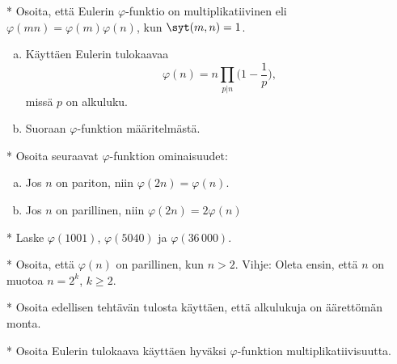 \begin{kotitehtavasivu}
\begin{tehtava}
    * Osoita, että Eulerin $\varphi$-funktio on multiplikatiivinen
    eli $\varphi(mn) = \varphi(m) \varphi(n)$, kun $\syt(m, n)=1$.
    \begin{enumerate}[a)]
    \item Käyttäen Eulerin tulokaavaa
    \[
    \varphi(n)=n \prod_{p|n} \bigg(1-\frac{1}{p}\bigg),
    \]
    missä $p$ on alkuluku. 
    \item
    Suoraan $\varphi$-funktion määritelmästä.
    \end{enumerate}
\end{tehtava}

\begin{tehtava}
    *  Osoita seuraavat $\varphi$-funktion ominaisuudet:
    \begin{enumerate}[a)]
    \item
    Jos $n$ on pariton, niin $\varphi(2n)=\varphi(n)$.
    \item
    Jos $n$ on parillinen, niin $\varphi(2n)=2\varphi(n)$
    \end{enumerate}
\end{tehtava}

\begin{tehtava}
    * Laske $\varphi(1001)$, $\varphi(5040)$ ja $\varphi(36\,000)$.
\end{tehtava}

\begin{tehtava}
    * Osoita, että $\varphi(n)$ on parillinen, kun $n>2$. Vihje: Oleta ensin, että $n$ on muotoa $n=2^k$, $k\ge 2$.
\end{tehtava}

\begin{tehtava}
    * Osoita edellisen tehtävän tulosta käyttäen, että alkulukuja on äärettömän monta.
\end{tehtava}

\begin{tehtava}
    * Osoita Eulerin tulokaava käyttäen hyväksi  $\varphi$-funktion multiplikatiivisuutta.
\end{tehtava}

\end{kotitehtavasivu}
